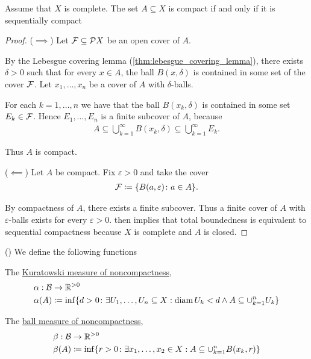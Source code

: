 \begin{theorem}\label{thm:metric_compact_iff_sequentially_compact}
  Assume that $X$ is complete. The set $A \subseteq X$ is compact if and only if it is sequentially compact
\end{theorem}
\begin{proof}
  ($\implies$) Let $\mathcal{F} \subseteq \mathcal{P} X$ be an open cover of $A$.

  By the Lebesgue covering lemma (\cref{thm:lebesgue_covering_lemma}), there exists $\delta > 0$ such that for every $x \in A$, the ball $B(x, \delta)$ is contained in some set of the cover $\mathcal{F}$. Let $x_1, \ldots, x_n$ be a cover of $A$ with $\delta$-balls.

  For each $k = 1, \ldots, n$ we have that the ball $B(x_k, \delta)$ is contained in some set $E_k \in \mathcal{F}$. Hence $E_1, \ldots, E_n$ is a finite subcover of $A$, because
  \begin{align*}
    A \subseteq \bigcup_{k=1}^\infty B(x_k, \delta) \subseteq \bigcup_{k=1}^\infty E_k.
  \end{align*}

  Thus $A$ is compact.

  ($\impliedby$) Let $A$ be compact. Fix $\varepsilon > 0$ and take the cover
  \begin{align*}
    \mathcal{F} \coloneqq \{ B(a, \varepsilon) \colon a \in A \}.
  \end{align*}

  By compactness of $A$, there exists a finite subcover. Thus a finite cover of $A$ with $\varepsilon$-balls exists for every $\varepsilon > 0$.  then implies that total boundedness is equivalent to sequential compactness because $X$ is complete and $A$ is closed.
\end{proof}

\begin{definition}\label{def:noncompactness_measures}(\cite[definition 7.1]{Deimling1985})
  We define the following functions
  \begin{defenum}
    \item\label{def:noncompactness_measures/sets} The \uline{Kuratowski measure of noncompactness},
    \begin{align*}
      &\alpha: \mathcal{B} \to \mathbb{R}^{>0} \\
      &\alpha(A) \coloneqq \inf \{d > 0 \colon \exists U_1, \ldots, U_n \subseteq X: \operatorname{diam} {U_k} < d \land A \subseteq \cup_{k=1}^n U_k \}
    \end{align*}

    \item\label{def:noncompactness_measures/balls} The \uline{ball measure of noncompactness},
    \begin{align*}
      &\beta: \mathcal{B} \to \mathbb{R}^{>0} \\
      &\beta(A) \coloneqq \inf \{r > 0 \colon \exists x_1, \ldots, x_2 \in X: A \subseteq \cup_{k=1}^n B(x_k, r) \}
    \end{align*}
  \end{defenum}
\end{definition}
